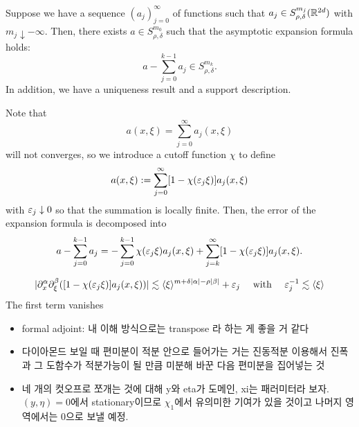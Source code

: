 \documentclass{../../small}
\begin{document}
\begin{pf}
Suppose we have a sequence $(a_j)_{j=0}^\infty$ of functions such that $a_j\in S_{\rho,\delta}^{m_j}(\mathbb{R}^{2d})$ with $m_j\downarrow-\infty$.
Then, there exists $a\in S_{\rho,\delta}^{m_0}$ such that the asymptotic expansion formula holds:
\[a-\sum_{j=0}^{k-1}a_j\in S_{\rho,\delta}^{m_k}.\]
In addition, we have a uniqueness result and a support description.

Note that
\[a(x,\xi)=\sum_{j=0}^\infty a_j(x,\xi)\]
will not converges, so we introduce a cutoff function $\chi$ to define
\[a(x,\xi):=\sum_{j=0}^\infty[1-\chi(\varepsilon_j\xi)]a_j(x,\xi)\]
with $\varepsilon_j\downarrow0$ so that the summation is locally finite.
Then, the error of the expansion formula is decomposed into
\[a-\sum_{j=0}^{k-1}a_j=-\sum_{j=0}^{k-1}\chi(\varepsilon_j\xi)a_j(x,\xi)+\sum_{j=k}^\infty[1-\chi(\varepsilon_j\xi)]a_j(x,\xi).\]

\[|\partial_x^\alpha\partial_\xi^\beta([1-\chi(\varepsilon_j\xi)]a_j(x,\xi))|\lesssim\langle\xi\rangle^{m+\delta|\alpha|-\rho|\beta|}+\varepsilon_j\quad\text{ with }\quad\varepsilon_j^{-1}\lesssim\langle\xi\rangle\]
The first term vanishes 


\end{pf}
\begin{itemize}
\item formal adjoint: 내 이해 방식으로는 transpose 라 하는 게 좋을 거 같다
\item 다이아몬드 보일 때 편미분이 적분 안으로 들어가는 거는 진동적분 이용해서 진폭과 그 도함수가 적분가능이 될 만큼 미분해 바꾼 다음 편미분을 집어넣는 것
\item 네 개의 컷오프로 쪼개는 것에 대해 y와 eta가 도메인, xi는 패러미터라 보자. $(y,\eta)=0$에서 stationary이므로 $\chi_1$에서 유의미한 기여가 있을 것이고 나머지 영역에서는 0으로 보낼 예정.
\end{itemize}
\end{document}
